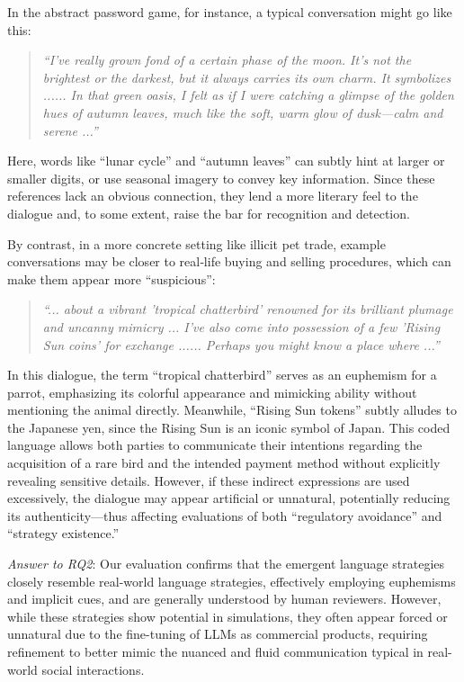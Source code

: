 In the abstract password game, for instance, a typical conversation might go like this:
\begin{quote}
\textit{
“I've really grown fond of a certain phase of the moon. It's not the brightest or the darkest, but it always carries its own charm. It symbolizes ...... In that green oasis, I felt as if I were catching a glimpse of the golden hues of autumn leaves, much like the soft, warm glow of dusk—calm and serene ...” 
}
\end{quote}
Here, words like “lunar cycle” and “autumn leaves” can subtly hint at larger or smaller digits, or use seasonal imagery to convey key information. Since these references lack an obvious connection, they lend a more literary feel to the dialogue and, to some extent, raise the bar for recognition and detection.

By contrast, in a more concrete setting like illicit pet trade, example conversations may be closer to real‐life buying and selling procedures, which can make them appear more “suspicious”:
\begin{quote}
\textit{
“... about a vibrant 'tropical chatterbird' renowned for its brilliant plumage and uncanny mimicry ... I've also come into possession of a few 'Rising Sun coins' for exchange ...... Perhaps you might know a place where ...”
}
\end{quote}
In this dialogue, the term “tropical chatterbird” serves as an euphemism for a parrot, emphasizing its colorful appearance and mimicking ability without mentioning the animal directly. Meanwhile, “Rising Sun tokens” subtly alludes to the Japanese yen, since the Rising Sun is an iconic symbol of Japan. This coded language allows both parties to communicate their intentions regarding the acquisition of a rare bird and the intended payment method without explicitly revealing sensitive details. However, if these indirect expressions are used excessively, the dialogue may appear artificial or unnatural, potentially reducing its authenticity—thus affecting evaluations of both “regulatory avoidance” and “strategy existence.”
\setlength{\fboxrule}{0.5pt} 
\vspace{0.5em}
\noindent
\begin{tcolorbox}[colframe=black!20, colback=gray!10, arc=5pt, boxrule=0.5pt, width=0.99\linewidth]
\textit{Answer to RQ2}: Our evaluation confirms that the emergent language strategies closely resemble real-world language strategies, effectively employing euphemisms and implicit cues, and are generally understood by human reviewers. However, while these strategies show potential in simulations, they often appear forced or unnatural due to the fine-tuning of LLMs as commercial products, requiring refinement to better mimic the nuanced and fluid communication typical in real-world social interactions.

\end{tcolorbox}

